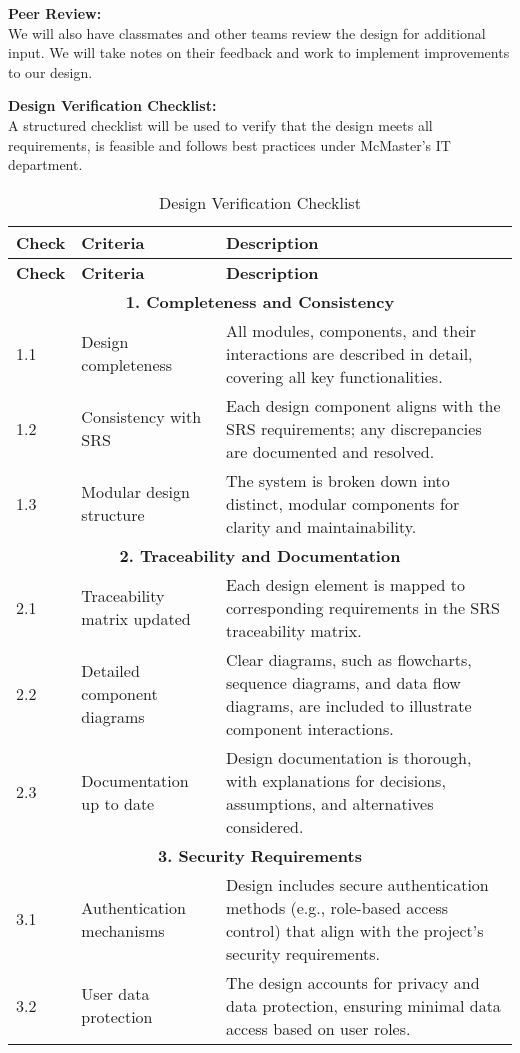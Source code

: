 \documentclass[12pt, titlepage]{article}
\begin{document}
\textbf{Peer Review:} \\
We will also have classmates and other teams review the design for additional input. We will take notes on their feedback and work to implement improvements to our design.

\textbf{Design Verification Checklist:} \\
A structured checklist will be used to verify that the design meets all requirements, is feasible and follows best practices under McMaster’s IT department.

\begin{longtable}{|p{1cm}|p{6cm}|p{8cm}|}
\caption{Design Verification Checklist} \\
\hline
\textbf{Check} & \textbf{Criteria} & \textbf{Description} \\
\hline
\endfirsthead
\hline
\textbf{Check} & \textbf{Criteria} & \textbf{Description} \\
\hline
\endhead

\multicolumn{3}{|c|}{\textbf{1. Completeness and Consistency}} \\
\hline
1.1 & Design completeness & All modules, components, and their interactions are described in detail, covering all key functionalities. \\
\hline
1.2 & Consistency with SRS & Each design component aligns with the SRS requirements; any discrepancies are documented and resolved. \\
\hline
1.3 & Modular design structure & The system is broken down into distinct, modular components for clarity and maintainability. \\
\hline

\multicolumn{3}{|c|}{\textbf{2. Traceability and Documentation}} \\
\hline
2.1 & Traceability matrix updated & Each design element is mapped to corresponding requirements in the SRS traceability matrix. \\
\hline
2.2 & Detailed component diagrams & Clear diagrams, such as flowcharts, sequence diagrams, and data flow diagrams, are included to illustrate component interactions. \\
\hline
2.3 & Documentation up to date & Design documentation is thorough, with explanations for decisions, assumptions, and alternatives considered. \\
\hline

\multicolumn{3}{|c|}{\textbf{3. Security Requirements}} \\
\hline
3.1 & Authentication mechanisms & Design includes secure authentication methods (e.g., role-based access control) that align with the project’s security requirements. \\
\hline
3.2 & User data protection & The design accounts for privacy and data protection, ensuring minimal data access based on user roles. \\
\hline


\end{longtable}
\end{document}
